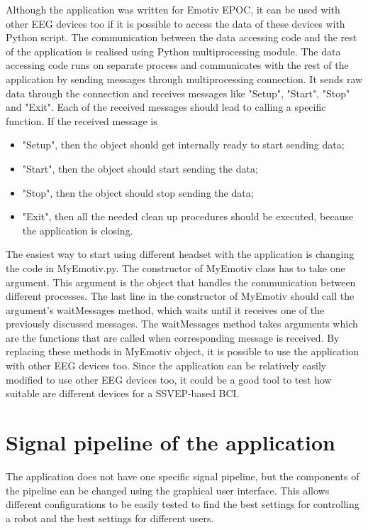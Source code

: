 Although the application was written for Emotiv EPOC, it can be used with other \gls{EEG} devices too if it is possible to access the data of these devices with Python script. The communication between the data accessing code and the rest of the application is realised using Python multiprocessing module. The data accessing code runs on separate process and communicates with the rest of the application by sending messages through multiprocessing connection. It sends raw data through the connection and receives messages like "Setup", "Start", "Stop" and "Exit". Each of the received messages should lead to calling a specific function. If the received message is
\begin{itemize}
	\item "Setup", then the object should get internally ready to start sending data;
	\item "Start", then the object should start sending the data;
	\item "Stop", then the object should stop sending the data;
	\item "Exit", then all the needed clean up procedures should be executed, because the application is closing.
\end{itemize}

The easiest way to start using different headset with the application is changing the code in MyEmotiv.py. The constructor of MyEmotiv class has to take one argument. This argument is the object that handles the communication between different processes. The last line in the constructor of MyEmotiv should call the argument's waitMessages method, which waits until it receives one of the previously discussed messages. The waitMessages method takes arguments which are the functions that are called when corresponding message is received. By replacing these methods in MyEmotiv object, it is possible to use the application with other \gls{EEG} devices too. Since the application can be relatively easily modified to use other \gls{EEG} devices too, it could be a good tool to test how suitable are different devices for a \gls{SSVEP}-based \gls{BCI}.

\section{Signal pipeline of the application}
\label{sec:signal_pipeline}

The application does not have one specific signal pipeline, but the components of the pipeline can be changed using the graphical user interface. This allows different configurations to be easily tested to find the best settings for controlling a robot and the best settings for different users.

